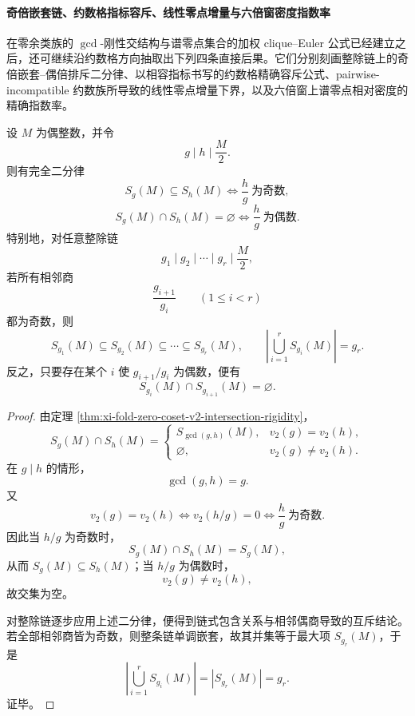 \paragraph{奇倍嵌套链、约数格指标容斥、线性零点增量与六倍窗密度指数率}
在零余类族的 \(\gcd\)-刚性交结构与谱零点集合的加权 clique--Euler 公式已经建立之后，还可继续沿约数格方向抽取出下列四条直接后果。它们分别刻画整除链上的奇倍嵌套--偶倍排斥二分律、以相容指标书写的约数格精确容斥公式、pairwise-incompatible 约数族所导致的线性零点增量下界，以及六倍窗上谱零点相对密度的精确指数率。

\begin{theorem}[零余类沿整除链的奇倍嵌套与偶倍排斥]\label{thm:xi-time-part72-zero-coset-divisibility-nested-disjoint-dichotomy}
设 \(M\) 为偶整数，并令
\[
g\mid h\mid \frac{M}{2}.
\]
则有完全二分律
\[
S_g(M)\subseteq S_h(M)
\iff
\frac{h}{g}\ \text{为奇数},
\]
\[
S_g(M)\cap S_h(M)=\varnothing
\iff
\frac{h}{g}\ \text{为偶数}.
\]
特别地，对任意整除链
\[
g_1\mid g_2\mid \cdots \mid g_r\mid \frac{M}{2},
\]
若所有相邻商
\[
\frac{g_{i+1}}{g_i}\qquad (1\le i<r)
\]
都为奇数，则
\[
S_{g_1}(M)\subseteq S_{g_2}(M)\subseteq \cdots \subseteq S_{g_r}(M),
\qquad
\left|\bigcup_{i=1}^{r}S_{g_i}(M)\right|=g_r.
\]
反之，只要存在某个 \(i\) 使 \(g_{i+1}/g_i\) 为偶数，便有
\[
S_{g_i}(M)\cap S_{g_{i+1}}(M)=\varnothing.
\]
\end{theorem}
\begin{proof}
由定理 \ref{thm:xi-fold-zero-coset-v2-intersection-rigidity}，
\[
S_g(M)\cap S_h(M)=
\begin{cases}
S_{\gcd(g,h)}(M),& v_2(g)=v_2(h),\\[2mm]
\varnothing,& v_2(g)\neq v_2(h).
\end{cases}
\]
在 \(g\mid h\) 的情形，
\[
\gcd(g,h)=g.
\]
又
\[
v_2(g)=v_2(h)
\iff
v_2(h/g)=0
\iff
\frac{h}{g}\ \text{为奇数}.
\]
因此当 \(h/g\) 为奇数时，
\[
S_g(M)\cap S_h(M)=S_g(M),
\]
从而 \(S_g(M)\subseteq S_h(M)\)；当 \(h/g\) 为偶数时，
\[
v_2(g)\neq v_2(h),
\]
故交集为空。

对整除链逐步应用上述二分律，便得到链式包含关系与相邻偶商导致的互斥结论。若全部相邻商皆为奇数，则整条链单调嵌套，故其并集等于最大项 \(S_{g_r}(M)\)，于是
\[
\left|\bigcup_{i=1}^{r}S_{g_i}(M)\right|=|S_{g_r}(M)|=g_r.
\]
证毕。
\end{proof}

